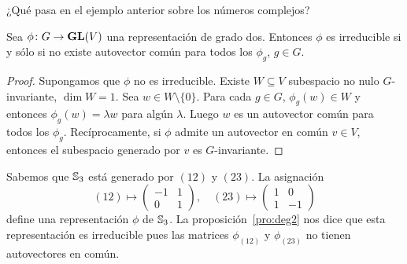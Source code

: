 \begin{exercise}
    ¿Qué pasa en el ejemplo anterior sobre los números complejos?
\end{exercise}


\begin{proposition}
  \label{pro:deg2}
  Sea $\phi\colon G\to \mathbf{GL}(V)$ una representación de grado dos. Entonces $\phi$ es
  irreducible si y sólo si no existe autovector común para todos los $\phi_g$,
  $g\in G$.
\end{proposition}

\begin{proof}
  Supongamos que $\phi$ no es irreducible. Existe $W\subseteq V$
  subespacio no nulo $G$-invariante, $\dim W=1$. Sea $w\in W\setminus\{0\}$.
  Para cada $g\in G$, $\phi_g(w)\in W$ y entonces $\phi_g(w)=\lambda w$ para
  algún $\lambda$. Luego $w$ es un autovector común para todos los $\phi_g$.
  Recíprocamente, si $\phi$ admite un autovector en común $v\in V$, entonces el
  subespacio generado por $v$ es $G$-invariante.
\end{proof}

\begin{example}
  \label{exa:S3deg2}
  Sabemos que $\mathbb{S}_3$ está generado por $(12)$ y $(23)$. La asignación
  \[(12)\mapsto\begin{pmatrix}
    -1 & 1\\
    0 & 1
  \end{pmatrix},
  \quad
  (23)\mapsto\begin{pmatrix}
    1 & 0\\
    1 & -1
  \end{pmatrix}
  \]
  define una representación $\phi$ de $\mathbb{S}_3$. 
  La proposición~\ref{pro:deg2} nos dice que esta representación 
  es irreducible pues las matrices $\phi_{(12)}$ y $\phi_{(23)}$
  no tienen autovectores en común.

\end{example}

